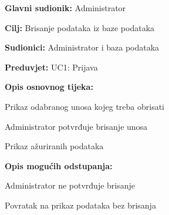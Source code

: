 					\noindent {}
					\begin{packed_item}
						
						\item \textbf{Glavni sudionik: }Administrator
						\item  \textbf{Cilj:} Brisanje podataka iz baze podataka
						\item  \textbf{Sudionici:} Administrator i baza podataka
						\item  \textbf{Preduvjet:} UC1: Prijava
						\item  \textbf{Opis osnovnog tijeka:}
						
						\item[] \begin{packed_enum}
							
							\item Prikaz odabranog unosa kojeg treba obrisati
							\item Administrator potvrđuje brisanje unosa
							\item Prikaz ažuriranih podataka 
							
						\end{packed_enum}
						
						\item  \textbf{Opis mogućih odstupanja:}
						
						\item[] \begin{packed_item}
							
							\item[2.a] Administrator ne potvrđuje brisanje
							\item[] \begin{packed_enum}
								
								\item Povratak na prikaz podataka bez brisanja
								
							\end{packed_enum}
							
						\end{packed_item}
					\end{packed_item}
					
